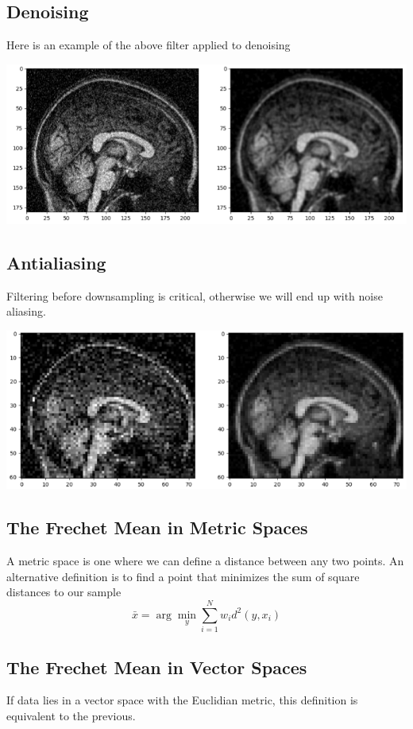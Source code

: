 \documentclass[10pt]{article}
\begin{document}
\subsection*{Denoising}
Here is an example of the above filter applied to denoising
\begin{center} 
	\includegraphics*[width=\textwidth]{W9_2.png} 
\end{center}

\subsection*{Antialiasing}
Filtering before downsampling is critical, otherwise we will end up with noise aliasing.
\begin{center} 
	\includegraphics*[width=\textwidth]{W9_3.png} 
\end{center}

\subsection*{The Frechet Mean in Metric Spaces}
A metric space is one where we can define a distance between any two points.  An alternative definition is to find a point that minimizes the sum of square distances to our sample
\[\bar{x} = \arg \min_y \sum_{i = 1}^N w_i d^2(y, x_i)\]

\subsection*{The Frechet Mean in Vector Spaces}
If data lies in a vector space with the Euclidian metric, this definition is equivalent to the previous.
\end{document}
